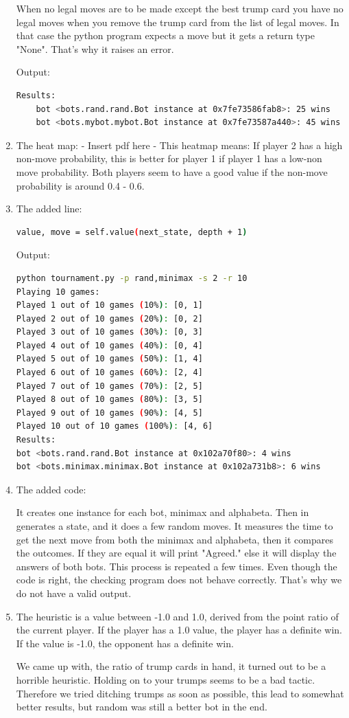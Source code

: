 \documentclass[a4paper,11pt]{article}
\begin{document}
\begin{enumerate}
When no legal moves are to be made except the best trump card you have no legal moves when you  remove the trump card from the list of legal moves. In that case the python program expects a move but it gets a return type "None". That's why it raises an error.

Output:
\begin{lstlisting}[language=bash]
Results:
    bot <bots.rand.rand.Bot instance at 0x7fe73586fab8>: 25 wins
    bot <bots.mybot.mybot.Bot instance at 0x7fe73587a440>: 45 wins
\end{lstlisting}

\item The heat map:
- Insert pdf here - This heatmap means:
If player 2 has a high non-move probability, this is better for player 1 if player 1 has a low-non move probability. Both players seem to have a good value if the non-move probability is around 0.4 - 0.6.

\item The added line:
\begin{lstlisting}[language=bash]
value, move = self.value(next_state, depth + 1)
\end{lstlisting}
Output:
\begin{lstlisting}[language=bash]
python tournament.py -p rand,minimax -s 2 -r 10
Playing 10 games:
Played 1 out of 10 games (10%): [0, 1] 
Played 2 out of 10 games (20%): [0, 2] 
Played 3 out of 10 games (30%): [0, 3] 
Played 4 out of 10 games (40%): [0, 4] 
Played 5 out of 10 games (50%): [1, 4] 
Played 6 out of 10 games (60%): [2, 4] 
Played 7 out of 10 games (70%): [2, 5] 
Played 8 out of 10 games (80%): [3, 5] 
Played 9 out of 10 games (90%): [4, 5] 
Played 10 out of 10 games (100%): [4, 6] 
Results:
bot <bots.rand.rand.Bot instance at 0x102a70f80>: 4 wins
bot <bots.minimax.minimax.Bot instance at 0x102a731b8>: 6 wins
\end{lstlisting}

\item The added code:


It creates one instance for each bot, minimax and alphabeta. Then in generates a state, and it does a few random moves. It measures the time to get the next move from both the minimax and alphabeta, then it compares the outcomes. If they are equal it will print "Agreed." else it will display the answers of both bots. This process is repeated a few times.
Even though the code is right, the checking program does not behave correctly. That's why we do not have a valid output.

\item The heuristic is a value between -1.0 and 1.0, derived from the point ratio of the current player. If the player has a 1.0 value, the player has a definite win. If the value is -1.0, the opponent has a definite win.

We came up with, the ratio of trump cards in hand, it turned out to be a horrible heuristic. Holding on to your trumps seems to be a bad tactic. Therefore we tried ditching trumps as soon as possible, this lead to somewhat better results, but random was still a better bot in the end. 

\end{enumerate}
\end{document}
